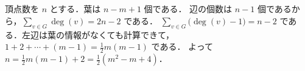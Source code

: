 \subsection{}
 頂点数を $n$ とする．葉は $n-m+1$ 個である．
 辺の個数は $n-1$ 個であるから，$\sum_{v\in G}\deg(v) = 2n-2$ である．
 $\sum_{v\in G}\bigl(\deg(v)-1\bigr) = n-2$ である．左辺は葉の情報がなくても計算できて，$1+2+\cdots+(m-1) = \frac12 m(m-1)$ である．
 よって $n = \frac12 m(m-1) + 2 = \frac12(m^2-m+4)$．